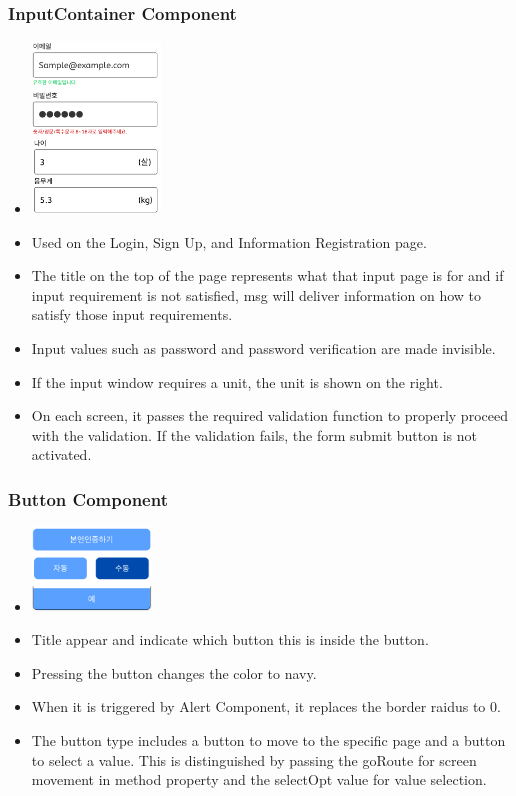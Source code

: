 \documentclass[conference]{IEEEtran}
\begin{document}
\subsubsection{InputContainer Component}
\begin{itemize}
    \item[] \includegraphics[width=0.27\textwidth]{img/C/2.png}
    \item Used on the Login, Sign Up, and Information Registration page.
    \item The title on the top of the page represents what that input page is for and if input requirement is not satisfied, msg will deliver information on how to satisfy those input requirements.
    \item Input values such as password and password verification are made invisible.
    \item If the input window requires a unit, the unit is shown on the right.
    \item On each screen, it passes the required validation function to properly proceed with the validation. If the validation fails, the form submit button is not activated. \\
\end{itemize}

\subsubsection{Button Component}
\begin{itemize}
    \item[] \includegraphics[width=0.25\textwidth]{img/C/3.png}
    \item Title appear and indicate which button this is inside the button.
    \item Pressing the button changes the color to navy.
    \item When it is triggered by Alert Component, it replaces the border raidus to 0.
    \item The button type includes a button to move to the specific page and a button to select a value. This is distinguished by passing the goRoute for screen movement in method property and the selectOpt value for value selection.\\
\end{itemize}
\end{document}
